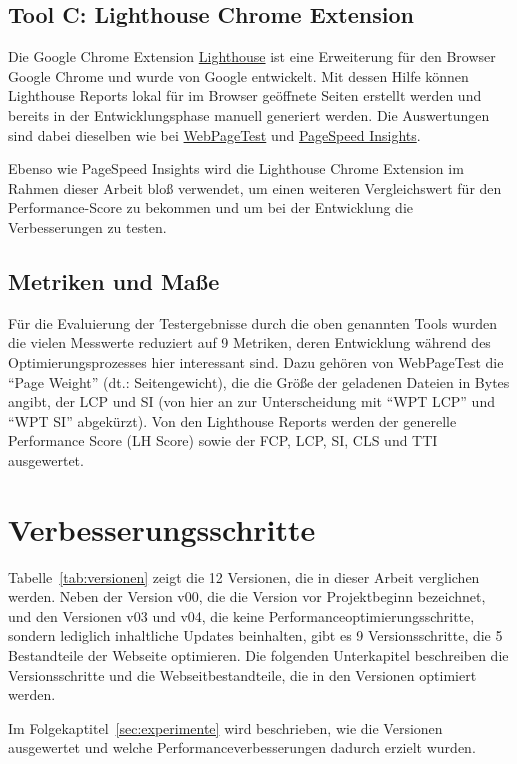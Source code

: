 \documentclass[11pt,a4paper]{article}
\begin{document}
\subsection{Tool C: Lighthouse Chrome Extension}\label{subsec:Lighthouse}
Die Google Chrome Extension \href{https://chromewebstore.google.com/detail/lighthouse/blipmdconlkpinefehnmjammfjpmpbjk}{Lighthouse} ist eine Erweiterung für den Browser Google Chrome und wurde von Google entwickelt.
Mit dessen Hilfe können Lighthouse Reports lokal für im Browser geöffnete Seiten erstellt werden und bereits in der Entwicklungsphase manuell generiert werden.
Die Auswertungen sind dabei dieselben wie bei \hyperref[subsec:WebPageTest]{WebPageTest} und \hyperref[subsec:PageSpeed]{PageSpeed Insights}.

Ebenso wie PageSpeed Insights wird die Lighthouse Chrome Extension im Rahmen dieser Arbeit bloß verwendet, um einen weiteren Vergleichswert für den Performance-Score zu bekommen und um bei der Entwicklung die Verbesserungen zu testen.

\subsection{Metriken und Maße}
Für die Evaluierung der Testergebnisse durch die oben genannten Tools wurden die vielen Messwerte reduziert auf 9 Metriken, deren Entwicklung während des Optimierungsprozesses hier interessant sind.
Dazu gehören von WebPageTest die \enquote{Page Weight} (dt.: Seitengewicht), die die Größe der geladenen Dateien in Bytes angibt, der LCP und SI (von hier an zur Unterscheidung mit \enquote{WPT LCP} und \enquote{WPT SI} abgekürzt).
Von den Lighthouse Reports werden der generelle Performance Score (LH Score) sowie der FCP, LCP, SI, CLS und TTI ausgewertet.

\section{Verbesserungsschritte}
Tabelle~\ref{tab:versionen} zeigt die 12 Versionen, die in dieser Arbeit verglichen werden.
Neben der Version v00, die die Version vor Projektbeginn bezeichnet, und den Versionen v03 und v04, die keine Performanceoptimierungsschritte, sondern lediglich inhaltliche Updates beinhalten, gibt es 9 Versionsschritte, die 5 Bestandteile der Webseite optimieren.
Die folgenden Unterkapitel beschreiben die Versionsschritte und die Webseitbestandteile, die in den Versionen optimiert werden.

Im Folgekaptitel~\ref{sec:experimente} wird beschrieben, wie die Versionen ausgewertet und welche Performanceverbesserungen dadurch erzielt wurden.
\end{document}
